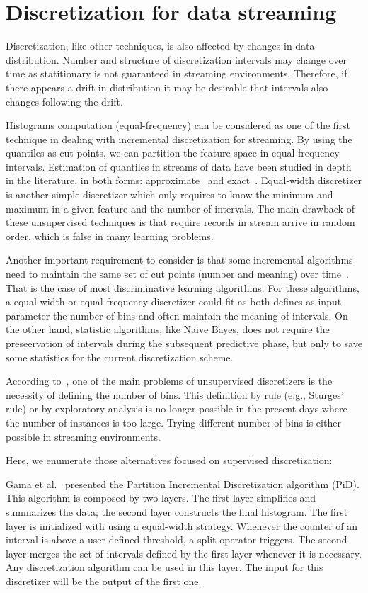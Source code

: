\documentclass[preprint,12pt]{elsarticle}
\begin{document}
\section{Discretization for data streaming}

Discretization, like other techniques, is also affected by changes in data distribution. Number and structure of discretization intervals may change over time as statitionary is not guaranteed in streaming environments. Therefore, if there appears a drift in distribution it  may be desirable that intervals also changes following the drift.

Histograms computation (equal-frequency) can be considered as one of the first technique in dealing with incremental discretization for streaming. By using the quantiles as cut points, we can partition the feature space in equal-frequency intervals. Estimation of quantiles in streams of data have been studied in depth in the literature, in both forms: approximate~\cite{ben10, webb14} and exact~\cite{gupta03, guha09}. Equal-width discretizer is another simple discretizer which only requires to know the minimum and maximum in a given feature and the number of intervals. The main drawback of these unsupervised techniques is that require records in stream arrive in random order, which is false in many learning problems. 

Another important requirement to consider is that some incremental algorithms need to maintain the same set of cut points (number and meaning) over time~\cite{webb14}. That is the case of most discriminative learning algorithms. For these algorithms, a equal-width or equal-frequency discretizer could fit as both defines as input parameter the number of bins and often maintain the meaning of intervals. On the other hand, statistic algorithms, like Naive Bayes, does not require the preseervation of intervals during the subsequent predictive phase, but only to save some statistics for the current discretization scheme. 

According to~\cite{gama06}, one of the main problems of unsupervised discretizers is the necessity of defining the number of bins. This definition by rule (e.g., Sturges' rule) or by exploratory analysis is no longer possible in the present days where the number of instances is too large. Trying different number of bins is either possible in streaming environments. 

Here, we enumerate those alternatives focused on supervised discretization:


Gama et al.~\cite{gama06} presented the Partition Incremental Discretization algorithm (PiD). This algorithm is composed by two layers. The first layer simplifies and summarizes the data; the second layer constructs the final histogram. The first layer is initialized with using a equal-width strategy. Whenever the counter of an interval is above a user defined threshold, a split operator triggers. The second layer merges the set of intervals defined by the first layer whenever it is necessary. Any discretization algorithm can be used in this layer. The input for this discretizer will be the output of the first one. 
\end{document}
